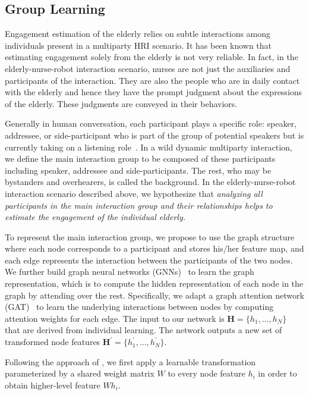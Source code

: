 \documentclass[VANCOUVER,STIX1COL]{WileyNJD-v2}
\begin{document}
\subsection{Group Learning}
\label{subs:Group_Learning}

Engagement estimation of the elderly relies on subtle interactions among individuals present in a multiparty HRI scenario. It has been known that estimating engagement solely from the elderly is not very reliable. In fact, in the elderly-nurse-robot interaction scenario, nurses are not just the auxiliaries and participants of the interaction. They are also the people who are in daily contact with the elderly and hence they have the prompt judgment about the expressions of the elderly. These judgments are conveyed in their behaviors.

Generally in human conversation, each participant plays a specific role: speaker, addressee, or side-participant who is part of the group of potential speakers but is currently taking on a listening role~\cite{Goffman1981Forms,Clark1996Using}. In a wild dynamic multiparty interaction, we define the main interaction group to be composed of these participants including speaker, addressee and side-participants. The rest, who may be bystanders and overhearers, is called the background.
In the elderly-nurse-robot interaction scenario described above, we hypothesize that \textit{analyzing all participants in the main interaction group and their relationships helps to estimate the engagement of the individual elderly.}

To represent the main interaction group, we propose to use the graph structure where each node corresponds to a participant and stores his/her feature map, and each edge represents the interaction between the participants of the two nodes. We further build graph neural networks (GNNs)~\cite{Scarselli2008Graph} to learn the graph representation, which is to compute the hidden representation of each node in the graph by attending over the rest. Specifically, we adapt a graph attention network (GAT)~\cite{Velivckovic2017Graph} to learn the underlying interactions between nodes by computing attention weights for each edge. The input to our network is $\mathbf{H} = \{h_1, ..., h_N\}$ that are derived from individual learning. The network outputs a new set of transformed node features $\mathbf{H}^{\prime} = \{h_1^{\prime}, ..., h_N^{\prime}\}$.

Following the approach of \cite{Velivckovic2017Graph}, we first apply a learnable transformation parameterized by a shared weight matrix $W$ to every node feature $h_i$ in order to obtain higher-level feature $W h_i$.
\end{document}
